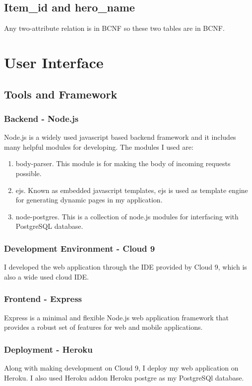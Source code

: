 \documentclass[a4paper]{article}
\begin{document}
\subsection{Item\_id and hero\_name}
Any two-attribute relation is in BCNF so these two tables are in BCNF.

\section{User Interface}
\subsection{Tools and Framework}
\subsubsection{Backend - Node.js}
Node.js is a widely used javascript based backend framework and it includes many helpful modules for developing. The modules I used are:
\begin{enumerate}
	\item body-parser. This module is for making the body of incoming requests possible.
	\item ejs. Known as embedded javascript templates, ejs is used as template engine for generating dynamic pages in my application.
	\item node-postgres. This is a collection of node.js modules for interfacing with PostgreSQL database.
\end{enumerate}
\subsubsection{Development Environment - Cloud 9}
I developed the web application through the IDE provided by Cloud 9, which is also a wide used cloud IDE.
\subsubsection{Frontend - Express}
Express is a minimal and flexible Node.js web application framework that provides a robust set of features for web and mobile applications.
\subsubsection{Deployment - Heroku}
Along with making development on Cloud 9, I deploy my web application on Heroku. I also used Heroku addon Heroku postgre as my PostgreSQl database.
\end{document}
